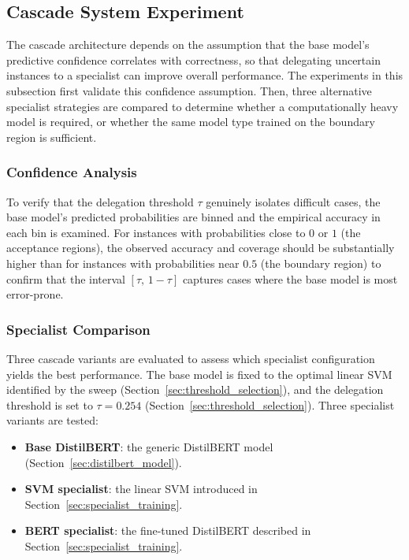 \documentclass[a4paper,twoside,12pt]{book}
\newcommand{\thresh}{\tau}
\begin{document}
\subsection{Cascade System Experiment} \label{sec:CascadeSysExp}

The cascade architecture depends on the assumption that the base model's predictive confidence correlates with correctness, so that delegating uncertain instances to a specialist can improve overall performance. The experiments in this subsection first validate this confidence assumption. Then, three alternative specialist strategies are compared to determine whether a computationally heavy model is required, or whether the same model type trained on the boundary region is sufficient.

\subsubsection{Confidence Analysis}

To verify that the delegation threshold $\thresh$ genuinely isolates difficult cases, the base model's predicted probabilities are binned and the empirical accuracy in each bin is examined. For instances with probabilities close to $0$ or $1$ (the acceptance regions), the observed accuracy and coverage should be substantially higher than for instances with probabilities near $0.5$ (the boundary region) to confirm that the interval $[\thresh,\,1-\thresh]$ captures cases where the base model is most error-prone.

\subsubsection{Specialist Comparison}

Three cascade variants are evaluated to assess which specialist configuration yields the best performance. The base model is fixed to the optimal linear SVM identified by the sweep (Section~\ref{sec:threshold_selection}), and the delegation threshold is set to $\thresh = 0.254$ (Section~\ref{sec:threshold_selection}). Three specialist variants are tested:

\begin{itemize}
	\item \textbf{Base DistilBERT}: the generic DistilBERT model (Section~\ref{sec:distilbert_model}).
	\item \textbf{SVM specialist}: the linear SVM introduced in Section~\ref{sec:specialist_training}.
	\item \textbf{BERT specialist}: the fine-tuned DistilBERT described in Section~\ref{sec:specialist_training}.
\end{itemize}
\end{document}
